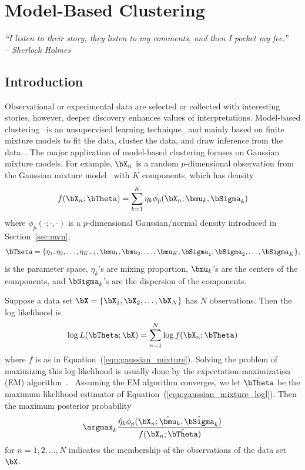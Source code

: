 
\chapter{Model-Based Clustering}
\label{chp:pmclust}


{\it
``I listen to their story, they listen to my comments, and then I
pocket my fee.'' \\
\--- Sherlock Holmes
}


\section{Introduction}

Observational or experimental data are selected or collected with
interesting stories, however, deeper discovery enhances values of
interpretations.
Model-based clustering~
is an unsupervised learning technique~
and mainly based on finite mixture models to fit the data, cluster the data,
and draw inference from the data~\citep{Fraley2002,Melnykov2010}.
The major application of
model-based clustering focuses on Gaussian mixture models. For example,
$\bX_n$ is a random $p$-dimensional observation from
the Gaussian mixture model~
with $K$ components, which has density
\begin{equation}
f(\bX_n; \bTheta) = \sum_{k = 1}^K \eta_k \phi_p(\bX_n; \bmu_k, \bSigma_k)
\label{eqn:gaussian_mixture}
\end{equation}
where $\phi_p(\cdot;\cdot,\cdot)$ is a $p$-dimensional Gaussian/normal density
introduced in Section~\ref{sec:mvn},
$$
\bTheta = \{\eta_1, \eta_2, \ldots, \eta_{K-1},
\bmu_1, \bmu_2, \ldots, \bmu_K, \bSigma_1, \bSigma_2, \ldots, \bSigma_K\},
$$
is the parameter space,
$\eta_k$'s are mixing proportion, $\bmu_k$'s are the centers of the components,
and $\bSigma_k$'s are the dispersion of the components.

Suppose a data set $\bX = \{\bX_1, \bX_2, \ldots, \bX_N\}$ has
$N$ observations.  Then the log likelihood is
\begin{equation}
\log L(\bTheta; \bX) = \sum_{n = 1}^N \log f(\bX_n; \bTheta)
\label{eqn:gaussian_mixture_logl}
\end{equation}
where $f$ is as in Equation~(\ref{eqn:gaussian_mixture}).
Solving the problem of maximizing this log-likelihood is usually done by the
expectation-maximization (EM)
algorithm~\citep{Dempster1977}.~
Assuming the EM algorithm converges, we let $\hat{\bTheta}$ be the
maximum likelihood estimator of Equation~(\ref{eqn:gaussian_mixture_logl}).
Then the maximum posterior probability
$$
\argmax_k
\frac{\hat{\eta}_k\phi_p(\bX_n; \hat{\bmu}_k, \hat{\bSigma}_k)
    }{f(\bX_n; \hat{\bTheta})}
$$
for $n = 1, 2, \ldots, N$
indicates the membership of the observations of the data set $\bX$.



